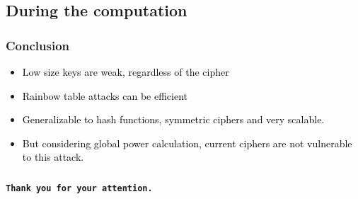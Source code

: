 \documentclass{beamer}
\begin{document}
    \begin{frame}
        \frametitle{}
    \end{frame}
    
    \begin{frame}
        \frametitle{}
    \end{frame}
    
    \begin{frame}
        \frametitle{}
    \end{frame}

    \subsection{During the computation}

\begin{frame}
    \frametitle{Conclusion}

    \begin{itemize}
        \item \textcolor{black}{Low size keys are weak, regardless of the cipher}
        \item \textcolor{black}{Rainbow table attacks can be efficient}
        \item \textcolor{black}{Generalizable to hash functions, symmetric ciphers and very scalable.}
	\item \textcolor{black}{But considering global power calculation, current ciphers are not vulnerable to this attack.}
    \end{itemize}

\end{frame}


\begin{frame}
    \frametitle{}
    \begin{center}
        {\Huge\bf\tt Thank you for your attention.}
    \end{center}
\end{frame}
\end{document}
